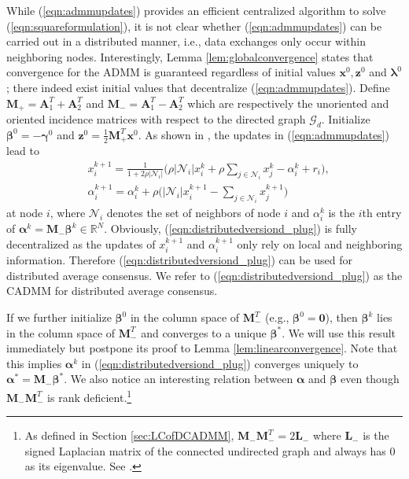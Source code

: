 \documentclass[journal]{IEEEtran}
\begin{document}
While (\ref{eqn:admmupdates}) provides an efficient centralized algorithm to solve (\ref{eqn:squareformulation}), it is not clear whether (\ref{eqn:admmupdates}) can be carried out in a distributed manner, i.e., data exchanges only occur within neighboring nodes. Interestingly, Lemma \ref{lem:globalconvergence} states that convergence for the ADMM is guaranteed regardless of initial values $\bm x^0,\bm z^0$ and $\bm \lambda^0$; there indeed exist initial values that decentralize (\ref{eqn:admmupdates}). Define $\bm M_+=\bm A_1^T+\bm A_2^T$ and $\bm M_-=\bm A_1^T-\bm A_2^T$ which are respectively the unoriented and oriented incidence matrices with respect to the directed graph $\mathcal{G}_d$. Initialize $\bm \beta^0= -\bm\gamma^0$ and $\bm z^0=\frac{1}{2}\bm M_+^T\bm x^0$. As shown in \cite{Shi2014}, the updates in (\ref{eqn:admmupdates}) lead to 
\begin{equation}
\label{eqn:distributedversiond_plug}
\begin{aligned}
&x_i^{k+1}=\frac{1}{1+2\rho|\mathcal{N}_i|}\Bigg(\rho|\mathcal{N}_i|x_i^k+\rho\sum_{j\in\mathcal{N}_i} x_j^k-\alpha_i^k+r_i\Bigg),\\
&\alpha_i^{k+1}=\alpha_i^k+\rho\Bigg(|\mathcal{N}_i|x_i^{k+1}-\sum_{j\in\mathcal{N}_i} x_j^{k+1}\Bigg)
\end{aligned}
\end{equation} 
at node $i$, where $\mathcal{N}_i$ denotes the set of neighbors of node $i$ and $\alpha_i^k$ is the $i$th entry of $\bm \alpha^k=\bm M_-\bm \beta^k\in\mathbb{R}^N$. Obviously, (\ref{eqn:distributedversiond_plug}) is fully decentralized as the updates of $x_i^{k+1}$ and $\alpha_i^{k+1}$ only rely on local and neighboring information. Therefore (\ref{eqn:distributedversiond_plug}) can be used for distributed average consensus. We refer to (\ref{eqn:distributedversiond_plug}) as the CADMM for distributed average consensus.

If we further initialize $\bm\beta^0$ in the column space of $\bm M_-^T$ (e.g., $\bm \beta^0=\bm 0$), then $\bm \beta^k$ lies in the column space of $\bm M_-^T$ and converges to a unique $\bm\beta^*$. We will use this result immediately but postpone its proof to Lemma \ref{lem:linearconvergence}. Note that this implies $\bm\alpha^k$ in (\ref{eqn:distributedversiond_plug}) converges uniquely to $\bm\alpha^*=\bm M_-\bm\beta^*$. We also notice an interesting relation between $\bm\alpha$ and $\bm\beta$ even though $\bm M_-\bm M_-^T$ is rank deficient.\footnote{As defined in Section \ref{sec:LCofDCADMM}, $\bm M_-\bm M_-^T=2\bm L_-$ where $\bm L_-$ is the signed Laplacian matrix of the connected undirected graph and always has $0$ as its eigenvalue. See \cite{ChungSpectral}.}
 
\end{document}
